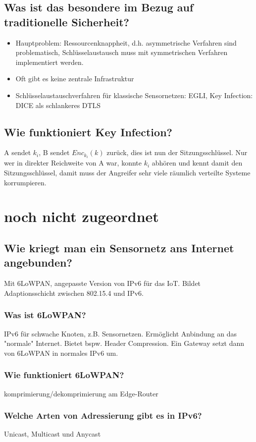 	\subsection{Was ist das besondere im Bezug auf traditionelle Sicherheit?}
	\begin{itemize}
		\item Hauptproblem: Ressourcenknappheit, d.h. asymmetrische Verfahren sind problematisch, Schlüsselaustausch muss mit symmetrischen Verfahren implementiert werden.
		\item Oft gibt es keine zentrale Infrastruktur
		\item Schlüsselaustauschverfahren für klassische Sensornetzen: EGLI, Key Infection: DICE als schlankeres DTLS
	\end{itemize}
	
	\subsection{Wie funktioniert Key Infection?}
	A sendet $k_i$, B sendet $Enc_{k_i}(k)$ zurück, dies ist nun der Sitzungsschlüssel.
	Nur wer in direkter Reichweite von A war, konnte $k_i$ abhören und kennt damit den Sitzungsschlüssel, damit muss der Angreifer sehr viele räumlich verteilte Systeme korrumpieren.
\section{noch nicht zugeordnet}
	\subsection{Wie kriegt man ein Sensornetz ans Internet angebunden?}
		Mit 6LoWPAN, angepasste Version von IPv6 für das IoT. Bildet Adaptionsschicht zwischen 802.15.4 und IPv6.
		\subsubsection{Was ist 6LoWPAN?}
		IPv6 für schwache Knoten, z.B. Sensornetzen. Ermöglicht Anbindung an das "normale" Internet. Bietet bspw. Header Compression. Ein Gateway setzt dann von 6LoWPAN in normales IPv6 um.
		\subsubsection{Wie funktioniert 6LoWPAN?}
		komprimierung/dekomprimierung am Edge-Router
		\subsubsection{Welche Arten von Adressierung gibt es in IPv6?}
		Unicast, Multicast und Anycast
